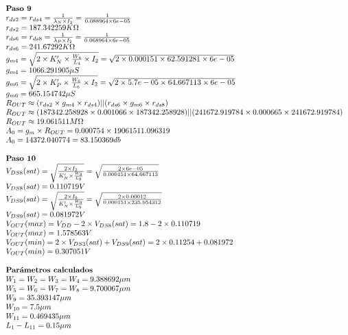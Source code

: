 \begin{equation*}
	\begin{array}{l l}
		\textbf{Paso 9} \\
		r_{ds2} = r_{ds4} = \frac{1}{\lambda_{N}\times I_{2}} = \frac{1}{ 0.088964 \times 6e-05 } \\
		r_{ds2} =  187.342259  K\Omega \\
		r_{ds6} = r_{ds8} = \frac{1}{\lambda_{P}\times I_{2}} = \frac{1}{ 0.068964 \times 6e-05 } \\
		r_{ds6} =  241.67292  K\Omega \\
		g_{m4} = \sqrt{2\times K'_{N}\times \frac{W_4}{L_4}\times I_{2}} = \sqrt{2\times 0.000151 \times 62.591281 \times 6e-05 } \\
		g_{m4} =  1066.291905  \mu S \\
		g_{m6} = \sqrt{2\times K'_{P}\times \frac{W_6}{L_6}\times I_{2}} = \sqrt{2\times 5.7e-05 \times 64.667113 \times 6e-05 } \\
		g_{m6} =  665.154742  \mu S \\
		R_{OUT} \approx (r_{ds2}\times g_{m4}\times r_{ds4})||(r_{ds6}\times g_{m6}\times r_{ds8}) \\
		R_{OUT} \approx ( 187342.258928 \times 0.001066 \times 187342.258928 )||( 241672.919784 \times 0.000665 \times 241672.919784 ) \\
		R_{OUT} \approx  19.061511  M\Omega \\
		A_{0} = g_{m}\times R_{OUT} =  0.000754 \times 19061511.096319  \\
		A_{0} =  14372.040774  =  83.150369  db \\
		\\
		\textbf{Paso 10} \\
		V_{DS8}(sat) = \sqrt{\frac{2\times I_{2}}{K'_{N}\times\frac{W_{8}}{L_{8}}}} = \sqrt{\frac{2\times 6e-05 }{ 0.000151 \times 64.667113 }} \\
		V_{DS8}(sat) =  0.110719  V \\
		V_{DS9}(sat) = \sqrt{\frac{2\times I_{9}}{K'_{N}\times\frac{W_{9}}{L_{9}}}} = \sqrt{\frac{2\times 0.00012 }{ 0.000151 \times 235.954312 }} \\
		V_{DS9}(sat) =  0.081972  V \\
		V_{OUT}(max) = V_{DD} - 2\times V_{DS8}(sat) =  1.8 - 2\times  0.110719  \\
		V_{OUT}(max) =  1.578563  V \\
		V_{OUT}(min) = 2\times V_{DS3}(sat) + V_{DS9}(sat) = 2\times  0.11254  +  0.081972  \\
		V_{OUT}(min) =  0.307051  V \\
		\\
		\textbf{Parámetros calculados} \\
		W_{1} = W_{2} = W_{3} = W_{4} =  9.388692  \mu m \\
		W_{5} = W_{6} = W_{7} = W_{8} =  9.700067  \mu m \\
		W_{9} =  35.393147  \mu m \\
		W_{10} =  7.5  \mu m \\
		W_{11} =  0.469435  \mu m \\
		L_{1} - L_{11} =  0.15  \mu m \\
	\end{array}
\end{equation*}